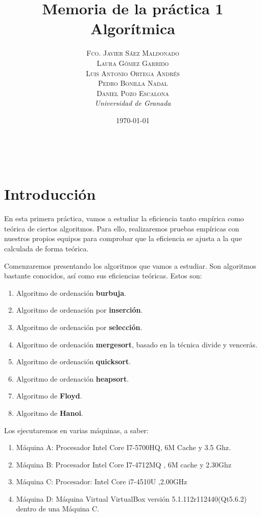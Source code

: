 \documentclass[a4paper, 11pt]{article}
\title{\textbf{Memoria de la práctica 1}\\ %
Algorítmica} %
\author{\textsc{Fco. Javier Sáez Maldonado}\\ %
\textsc{Laura Gómez Garrido}\\
\textsc{Luis Antonio Ortega Andrés}\\
\textsc{Pedro Bonilla Nadal}\\
\textsc{Daniel Pozo Escalona}\vspace{2cm}
\\{\textit{Universidad de Granada}}} %
\date{\today} %
\makeatletter
\renewcommand{\maketitle}{
  \begin{flushright} %
  
  {\LARGE\@title} %
  
  \vspace{50pt} %
  
  {\large\@author} %
  \\\@date %
  \vspace{40pt} %
  \end{flushright}
}
\makeatother
\begin{document}
\maketitle %


{\parskip=2pt
  \tableofcontents
}
\pagebreak



\section*{Introducción}

En esta primera práctica, vamos a estudiar la eficiencia tanto empírica como teórica de ciertos algoritmos. Para ello, realizaremos pruebas empíricas con nuestros propios equipos para comprobar que la eficiencia se ajusta a la que calculada de forma teórica.

Comenzaremos presentando los algoritmos que vamos a estudiar. Son algoritmos bastante conocidos, así como sus eficiencias teóricas. Estos son:
\begin{enumerate}
	\item Algoritmo de ordenación \textbf{burbuja}.
	\item Algoritmo de ordenación por \textbf{inserción}.
	\item Algoritmo de ordenación por \textbf{selección}.
	\item Algoritmo de ordenación \textbf{mergesort}, basado en la técnica divide y vencerás.
	\item Algoritmo de ordenación \textbf{quicksort}.
	\item Algoritmo de ordenación \textbf{heapsort}.
	\item Algoritmo de \textbf{Floyd}.
	\item Algoritmo de \textbf{Hanoi}.
\end{enumerate}

Los ejecutaremos en varias máquinas, a saber:
\begin{enumerate}    
	\item Máquina A: Procesador Intel Core I7-5700HQ, 6M Cache y 3.5 Ghz.
	\item Máquina B: Procesador Intel Core I7-4712MQ , 6M cache y 2.30Ghz
	\item Máquina C: Procesador: Intel Core i7-4510U ,2.00GHz
	\item Máquina D: Máquina Virtual VirtualBox versión 5.1.112r112440(Qt5.6.2) dentro de una Máquina C.

\end{enumerate}
\end{document}
